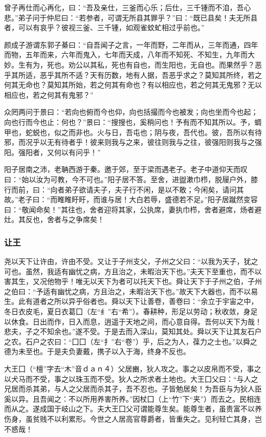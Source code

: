 \documentclass[]{article}
\begin{document}
曾子再仕而心再化，曰：``吾及亲仕，三釜而心乐；后仕，三千锺而不洎，吾心悲。''弟子问于仲尼曰：``若参者，可谓无所县其罪乎？''曰：``既已县矣！夫无所县者，可以有哀乎？彼视三釜、三千锺，如观雀蚊虻相过乎前也。''

颜成子游谓东郭子綦曰：``自吾闻子之言，一年而野，二年而从，三年而通，四年而物，五年而来，六年而鬼入，七年而天成，八年而不知死、不知生，九年而大妙。生有为，死也。劝公以其私，死也有自也，而生阳也，无自也。而果然乎？恶乎其所适，恶乎其所不适？天有历数，地有人据，吾恶乎求之？莫知其所终，若之何其无命也？莫知其所始，若之何其有命也？有以相应也，若之何其无鬼邪？无以相应也，若之何其有鬼邪？''

众罔两问于景曰：``若向也俯而今也仰，向也括撮而今也被发；向也坐而今也起；向也行而今也止：何也？''景曰：``搜搜也，奚稍问也！予有而不知其所以。予，蜩甲也，蛇蜕也，似之而非也。火与日，吾屯也；阴与夜，吾代也。彼，吾所以有待邪，而况乎以无有待者乎！彼来则我与之来，彼往则我与之往，彼强阳则我与之强阳。强阳者，又何以有问乎！''

阳子居南之沛，老聃西游于秦。邀于郊，至于梁而遇老子。老子中道仰天而叹曰：``始以汝为可教，今不可也。''阳子居不答。至舍，进盥漱巾栉，脱屦户外，膝行而前，曰：``向者弟子欲请夫子，夫子行不闲，是以不敢；今闲矣，请问其故。''老子曰：``而睢睢盱盱，而谁与居！大白若辱，盛德若不足。''阳子居蹴然变容曰：``敬闻命矣！''其往也，舍者迎将其家，公执席，妻执巾栉，舍者避席，炀者避灶。其反也，舍者与之争席矣！

\hypertarget{header-n452}{%
\subsubsection{让王}\label{header-n452}}

尧以天下让许由，许由不受。又让于子州支父，子州之父曰：``以我为天子，犹之可也。虽然，我适有幽忧之病，方且治之，未暇治天下也。''夫天下至重也，而不以害其生，又况他物乎！唯无以天下为者可以托天下也。舜让天下于子州之伯，子州之伯曰：``予适有幽忧之病，方且治之，未暇治天下也。''故天下大器也，而不以易生。此有道者之所以异乎俗者也。舜以天下让善卷，善卷曰：``余立于宇宙之中，冬日衣皮毛，夏日衣葛囗（左``纟''右``希''）。春耕种，形足以劳动；秋收敛，身足以休食。日出而作，日入而息，逍遥于天地之间，而心意自得。吾何以天下为哉！悲夫，子之不知余也。''遂不受。于是去而入深山，莫知其处。舜以天下让其友石户之农。石户之农曰：``囗囗（左``扌''右``卷''）乎，后之为人，葆力之士也。''以舜之德为未至也。于是夫负妻戴，携子以入于海，终身不反也。

大王囗（``檀''字去``木''音ｄａｎ４）父居豳，狄人攻之。事之以皮帛而不受，事之以犬马而不受，事之以珠玉而不受。狄人之所求者土地也。大王囗父曰：``与人之兄居而杀其弟，与人之父居而杀其子，吾不忍也。子皆勉居矣！为吾臣与为狄人臣奚以异。且吾闻之：不以所用养害所养。''因杖囗（上``竹''下``夹''）而去之。民相连而从之。遂成国于岐山之下。夫大王囗父可谓能尊生矣。能尊生者，虽贵富不以养伤身，虽贫贱不以利累形。今世之人居高官尊爵者，皆重失之。见利轻亡其身，岂不惑哉！
\end{document}

